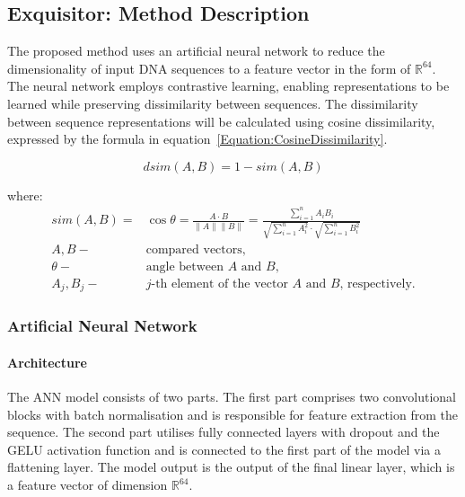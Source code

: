 \documentclass[biomedinformatics,article,submit,moreauthors]{Definitions/mdpi}
\begin{document}
    \subsection{Exquisitor: Method Description}

    The proposed method  uses an artificial neural network to reduce the dimensionality of input DNA sequences to a feature vector in the form of $\mathbb{R}^{64}$.
    The neural network employs contrastive learning, enabling representations to be learned while preserving dissimilarity between sequences.
    The dissimilarity between sequence representations will be calculated using cosine dissimilarity, expressed by the formula in equation~\eqref{Equation:CosineDissimilarity}.

            \begin{equation}
                dsim(A, B) = 1 - sim(A, B)
                \label{Equation:CosineDissimilarity}
            \end{equation}

            where:
            \begin{align*}
                sim(A, B) =& \cos{\theta} = \frac{A \cdot B}{\|A\| \|B\|} = \frac{
                    \sum^{n}_{i = 1}A_i B_i
                }{
                    \sqrt{
                        \sum^{n}_{i = 1}A_i^2
                    }
                    \cdot
                    \sqrt{
                        \sum^{n}_{i = 1}B_i^2
                    }
                } \\
                A, B -& \text{compared vectors,} \\
                \theta -& \text{angle between $A$ and $B$,} \\
                A_j, B_j -& \text{$j$-th element of the vector $A$ and $B$, respectively.}
            \end{align*}

            \subsubsection{Artificial Neural Network}
                \paragraph{Architecture}
                The ANN model consists of two parts. The first part comprises two convolutional blocks with batch normalisation and is responsible for feature extraction from the sequence. The second part utilises fully connected layers with dropout and the GELU activation function and is connected to the first part of the model via a flattening layer.
                The model output is the output of the final linear layer, which is a feature vector of dimension \( \mathbb{R}^{64} \).
\end{document}
